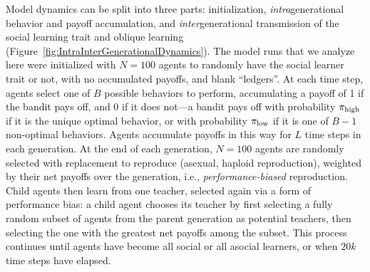 \documentclass[letterpaper,11.5pt]{scrartcl}
\begin{document}
Model dynamics can be split into three parts: initialization,
\emph{intra}generational behavior and payoff accumulation, and
\emph{inter}generational transmission of the social learning trait and oblique
learning (Figure~\ref{fig:IntraInterGenerationalDynamics}). 
The model runs that we analyze here were initialized with $N=100$ agents
to randomly have the social learner trait or not, with no accumulated payoffs, and
blank ``ledgers''. At each time step, agents select one of $B$ possible behaviors
to perform, accumulating a payoff of 1 if the bandit pays off, and 0 if it does
not---a bandit pays off with probability $\pi_{\mathrm{high}}$ if it is the unique optimal
behavior, or with probability $\pi_{\mathrm{low}}$ if it is one of $B-1$ non-optimal
behaviors. Agents accumulate payoffs in this way for $L$ time steps in each
generation. At the end of each generation, $N=100$ agents are randomly selected with
replacement to reproduce (asexual, haploid reproduction), 
weighted by their net payoffs over the generation,
i.e., \emph{performance-biased} reproduction. Child agents then learn from 
one teacher, selected again via a form of performance bias: a child agent chooses
its teacher by first selecting a fully random subset of agents from the 
parent generation as potential teachers, then selecting the one with the 
greatest net payoffs among the subset. This process continues until agents
have become all social or all asocial learners, or when $20k$ time steps have
elapsed. 
\end{document}

